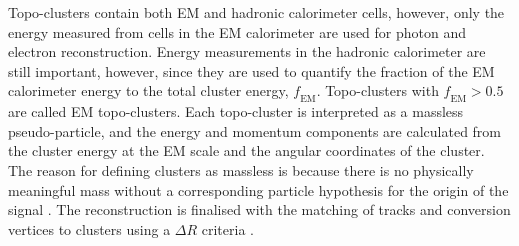 Topo-clusters contain both EM and hadronic calorimeter cells, however, only the energy measured from cells in the EM calorimeter are used for photon and electron reconstruction. Energy measurements in the hadronic calorimeter are still important, however, since they are used to quantify the fraction of the EM calorimeter energy to the total cluster energy, $\mathit{f}_{\text{EM}}$. Topo-clusters with $\mathit{f}_{\text{EM}} > 0.5$ are called EM topo-clusters. Each topo-cluster is interpreted as a massless pseudo-particle, and the energy and momentum components are calculated from the cluster energy at the EM scale and the angular coordinates of the cluster. The reason for defining clusters as massless is because there is no physically meaningful mass without a corresponding particle hypothesis for the origin of the signal \cite{Atlas:topoclusters}. The reconstruction is finalised with the matching of tracks and conversion vertices to clusters using a $\Delta R$ criteria \cite{Atlas:egam_reco}.

